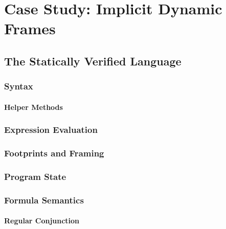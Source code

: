 \chapter{Case Study: Implicit Dynamic Frames}
\label{ch:case-study--implicit}


\section{The Statically Verified Language \svlidf}
\label{sec:language}


    \subsection{Syntax}
    \label{sec:syntax}
    
    
    \subsubsection{Helper Methods}
    
    
    \subsection{Expression Evaluation}
    \label{sec:expeval}
    
    
    \subsection{Footprints and Framing}
    \label{ssec:framing}
    
    
    \subsection{Program State}
    \label{ssec:program-state}
    
        
    \subsection{Formula Semantics}
    \label{ssec:formula-semantics}
    
    
        \subsubsection{Regular Conjunction}
        \label{sssec:regular-conjunction}
        
    
